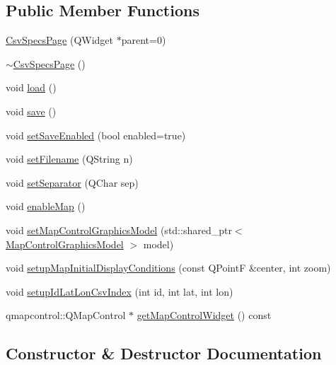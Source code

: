 \subsection*{Public Member Functions}
\begin{DoxyCompactItemize}
\item 
\mbox{\hyperlink{class_csv_specs_page_a0b4bb4ebb6d40d46166a0dacfc18f727}{Csv\+Specs\+Page}} (Q\+Widget $\ast$parent=0)
\item 
\mbox{\hyperlink{class_csv_specs_page_ae6d7daa9fc18716719f2cfd76f11ff1e}{$\sim$\+Csv\+Specs\+Page}} ()
\item 
void \mbox{\hyperlink{class_csv_specs_page_acfb8c42c4b7db4ebed29d3dea52fca2a}{load}} ()
\item 
void \mbox{\hyperlink{class_csv_specs_page_a035dbde7166d98157cf8481c71a487a3}{save}} ()
\item 
void \mbox{\hyperlink{class_csv_specs_page_ae492680c49968f628397135be280b335}{set\+Save\+Enabled}} (bool enabled=true)
\item 
void \mbox{\hyperlink{class_csv_specs_page_a07fb5b3e651d1fe9209aa3a10bb87099}{set\+Filename}} (Q\+String n)
\item 
void \mbox{\hyperlink{class_csv_specs_page_afaf960e286cc199363efb92e50e01ff0}{set\+Separator}} (Q\+Char sep)
\item 
void \mbox{\hyperlink{class_csv_specs_page_afccf72aa5acff8e6ac84778750b5ec4d}{enable\+Map}} ()
\item 
void \mbox{\hyperlink{class_csv_specs_page_aeb9809c47e715df9316f4ba953934399}{set\+Map\+Control\+Graphics\+Model}} (std\+::shared\+\_\+ptr$<$ \mbox{\hyperlink{class_map_control_graphics_model}{Map\+Control\+Graphics\+Model}} $>$ model)
\item 
void \mbox{\hyperlink{class_csv_specs_page_a0de0afb58bd383db7f2d8cad1e5c1435}{setup\+Map\+Initial\+Display\+Conditions}} (const Q\+PointF \&center, int zoom)
\item 
void \mbox{\hyperlink{class_csv_specs_page_ad3ac8f45d4c1bdcae7bc5eaae8fb773b}{setup\+Id\+Lat\+Lon\+Csv\+Index}} (int id, int lat, int lon)
\item 
qmapcontrol\+::\+Q\+Map\+Control $\ast$ \mbox{\hyperlink{class_csv_specs_page_a5b46149c6dbbfaae4d2fd6d6ed6696f7}{get\+Map\+Control\+Widget}} () const
\end{DoxyCompactItemize}


\subsection{Constructor \& Destructor Documentation}
\mbox{\label{class_csv_specs_page_a0b4bb4ebb6d40d46166a0dacfc18f727}} 
